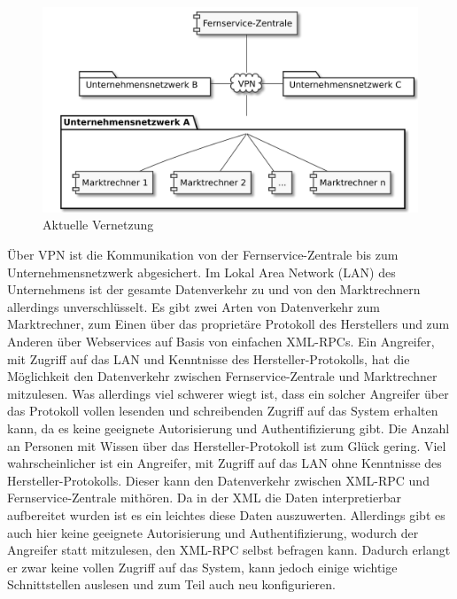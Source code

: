 \documentclass[11pt,a4paper]{report}
\begin{document}

\begin{figure}[h]
\centering
\includegraphics[scale=0.2]{images/problemfeld.pdf}
\caption{Aktuelle Vernetzung}
\label{fig:current_setup}
\end{figure}

Über VPN ist die Kommunikation von der Fernservice-Zentrale bis zum Unternehmensnetzwerk abgesichert. Im Lokal Area Network (LAN) des Unternehmens ist der gesamte Datenverkehr zu und von den Marktrechnern allerdings unverschlüsselt. Es gibt zwei Arten von Datenverkehr zum Marktrechner, zum Einen über das proprietäre Protokoll des Herstellers und zum Anderen über Webservices auf Basis von einfachen XML-RPCs. Ein Angreifer, mit Zugriff auf das LAN und Kenntnisse des Hersteller-Protokolls, hat die Möglichkeit den Datenverkehr zwischen Fernservice-Zentrale und Marktrechner mitzulesen. Was allerdings viel schwerer wiegt ist, dass ein solcher Angreifer über das Protokoll vollen lesenden und schreibenden Zugriff auf das System erhalten kann, da es keine geeignete Autorisierung und Authentifizierung gibt. Die Anzahl an Personen mit Wissen über das Hersteller-Protokoll ist zum Glück gering. Viel wahrscheinlicher ist ein Angreifer, mit Zugriff auf das LAN ohne Kenntnisse des Hersteller-Protokolls. Dieser kann den Datenverkehr zwischen XML-RPC und Fernservice-Zentrale mithören. Da in der XML die Daten interpretierbar aufbereitet wurden ist es ein leichtes diese Daten auszuwerten. Allerdings gibt es auch hier keine geeignete Autorisierung und Authentifizierung, wodurch der Angreifer statt mitzulesen, den XML-RPC selbst befragen kann. Dadurch erlangt er zwar keine vollen Zugriff auf das System, kann jedoch einige wichtige Schnittstellen auslesen und zum Teil auch neu konfigurieren. 
\end{document}
